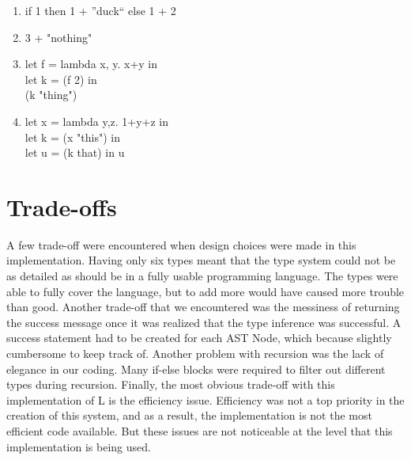 \documentclass{article}
\begin{document}
\begin{enumerate}
 \item if 1 then 1 + ''duck`` else 1 + 2
 \item 3 + "nothing"
 \item let f = lambda x, y. x+y in \\
let k = (f 2) in \\
(k "thing")
 \item let x = lambda y,z. 1+y+z in \\
let k = (x "this") in \\
let u = (k that) in u

\end{enumerate}

\section{Trade-offs} \*
  A few trade-off were encountered when design choices were made in this implementation. Having only
six types meant that the type system could not be as detailed as should be in a fully usable programming
language. The types were able to fully cover the language, but to add more would have caused more
trouble than good. Another trade-off that we encountered was the messiness of returning the success message
once it was realized that the type inference was successful. A success statement had to be created for each
AST Node, which because slightly cumbersome to keep track of. Another problem with recursion was the lack 
of elegance in our coding. Many if-else blocks were required to filter out different types during recursion.
Finally, the most obvious trade-off with this implementation of L is the efficiency issue. Efficiency was 
not a top priority in the creation of this system, and as a result, the implementation is not the most
efficient code available. But these issues are not noticeable at the level that this implementation is being
used.
\end{document}
